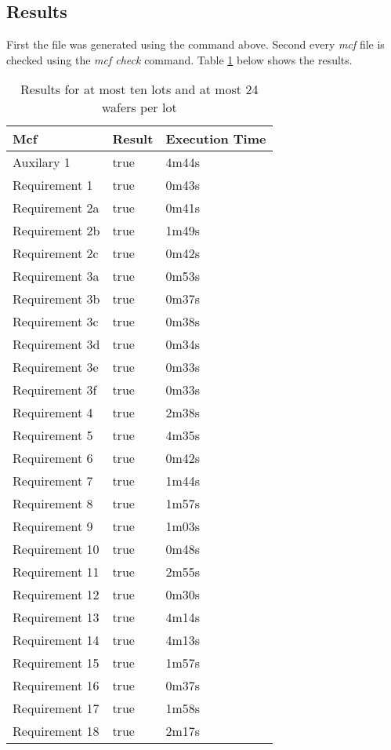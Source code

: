 \subsection{Results}
First the  file was generated using the  command above. Second every \textit{mcf} file is checked using the \textit{mcf check} command.
Table \ref{tab:results1024} below shows the results.
\begin{table}[!hb]
    \centering
    \begin{tabular}{|l|l|l|}
        \hline
        \textbf{Mcf} & \textbf{Result} & \textbf{Execution Time} \\ \hline
			Auxilary 1 & true & 4m44s \\ \hline
			Requirement 1 & true & 0m43s \\ \hline
			Requirement 2a & true & 0m41s \\ \hline
			Requirement 2b & true & 1m49s \\ \hline
			Requirement 2c & true & 0m42s \\ \hline
			Requirement 3a & true & 0m53s \\ \hline
			Requirement 3b & true & 0m37s \\ \hline
			Requirement 3c & true & 0m38s \\ \hline
			Requirement 3d & true & 0m34s \\ \hline
			Requirement 3e & true & 0m33s \\ \hline
			Requirement 3f & true & 0m33s \\ \hline
			Requirement 4 & true & 2m38s \\ \hline
			Requirement 5 & true & 4m35s \\ \hline
			Requirement 6 & true & 0m42s \\ \hline
			Requirement 7 & true & 1m44s \\ \hline
			Requirement 8 & true & 1m57s \\ \hline
			Requirement 9 & true & 1m03s \\ \hline
			Requirement 10 & true & 0m48s \\ \hline
			Requirement 11 & true & 2m55s \\ \hline
			Requirement 12 & true & 0m30s \\ \hline
			Requirement 13 & true & 4m14s \\ \hline
			Requirement 14 & true & 4m13s \\ \hline
			Requirement 15 & true & 1m57s \\ \hline
			Requirement 16 & true & 0m37s \\ \hline
			Requirement 17 & true & 1m58s \\ \hline
			Requirement 18 & true & 2m17s \\ \hline
    \end{tabular}
    \caption{Results for at most ten lots and at most 24 wafers per lot}
    \label{tab:results1024}
\end{table}
